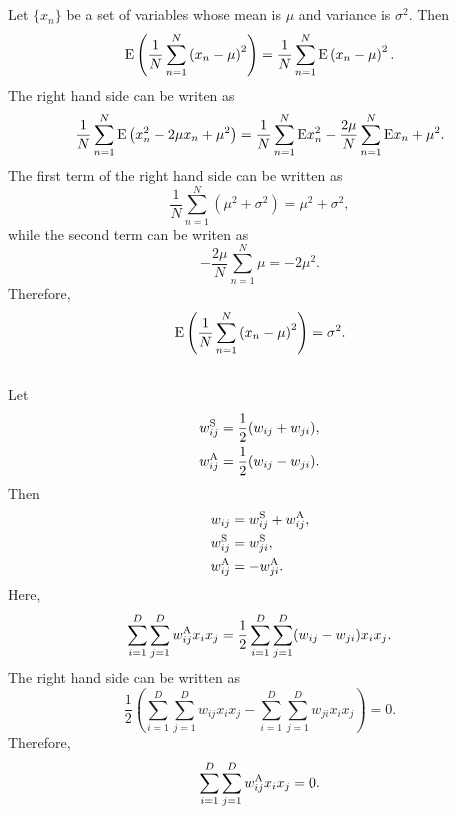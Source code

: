 \subsection{}
\label{1.13}
Let $\{ x_n \}$ be a set of variables whose mean is $\mu$ and variance is $\sigma ^ 2$.
Then
%
\begin{equation}
{\rm E} \left( \frac{1}{N} \sum_{n = 1}^{N} \left( x_n - \mu \right) ^ 2 \right) = \frac{1}{N} \sum_{n = 1}^{N} {\rm E} \left( x_n - \mu \right) ^ 2.
\end{equation}
%
The right hand side can be writen as 
%
\begin{equation}
\frac{1}{N} \sum_{n = 1}^{N} {\rm E} \left( x_n ^ 2 - 2 \mu x_n + \mu ^ 2 \right) = \frac{1}{N} \sum_{n = 1}^{N} {\rm E} x_n ^ 2 - \frac{2 \mu}{N}  \sum_{n = 1}^{N} {\rm E} x_n + \mu ^ 2.
\end{equation}
%
The first term of the right hand side can be written as 
%
\begin{equation}
\frac{1}{N} \sum_{n = 1}^{N} \left( \mu ^ 2 + \sigma ^ 2 \right) = \mu ^ 2 + \sigma ^ 2,
\end{equation}
%
while the second term can be writen as
%
\begin{equation}
- \frac{2 \mu}{N} \sum_{n = 1}^{N} \mu = - 2 \mu ^ 2.
\end{equation}
%
Therefore,
%
\begin{equation}
{\rm E} \left( \frac{1}{N} \sum_{n = 1}^{N} \left( x_n - \mu \right) ^ 2 \right) = \sigma ^2.
\end{equation}
%


\subsection{}
\label{1.14}
Let
%
\begin{equation}
\begin{aligned}
w_{ij}^{\rm S} &= \frac{1}{2} (w_{ij} + w_{ji}), \\
w_{ij}^{\rm A} &= \frac{1}{2} (w_{ij} - w_{ji}).
\end{aligned}
\end{equation}
%
Then
%
\begin{equation}
\begin{aligned}
w_{ij} &= w_{ij}^{\rm S} + w_{ij}^{\rm A}, \\
w_{ij}^{\rm S} &= w_{ji}^{\rm S}, \\
w_{ij}^{\rm A} &= - w_{ji}^{\rm A}.
\end{aligned}
\end{equation}
%
Here,
\begin{equation}
\sum_{i = 1}^{D} \sum_{j = 1}^{D} w_{ij}^{\rm A} x_i x_j = \frac{1}{2} \sum_{i = 1}^{D} \sum_{j = 1}^{D} (w_{ij} - w_{ji}) x_i x_j.
\end{equation}
%
The right hand side can be written as
%
\begin{equation}
\frac{1}{2} \left( \sum_{i = 1}^{D} \sum_{j = 1}^{D} w_{ij} x_i x_j - \sum_{i = 1}^{D} \sum_{j = 1}^{D} w_{ji} x_i x_j \right) = 0.
\end{equation}
%
Therefore, 
%
\begin{equation}
\sum_{i = 1}^{D} \sum_{j = 1}^{D} w_{ij}^{\rm A} x_i x_j = 0.
\end{equation}
%

